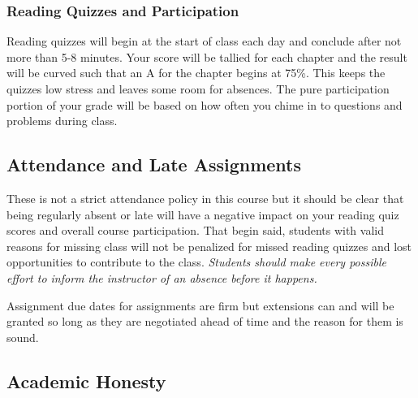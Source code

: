 \documentclass[10pt]{article}
\begin{document}
\subsubsection*{Reading Quizzes and Participation}

Reading quizzes will begin at the start of class each day and conclude after not more than 5-8 minutes. Your score will be tallied for each chapter and the result will be curved such that an A for the chapter begins at 75\%. This keeps the quizzes low stress and leaves some room for absences. The pure participation portion of your grade will be based on how often you chime in to questions and problems during class.

\subsection{Attendance and Late Assignments}

These is not a strict attendance policy in this course but it should be clear that being regularly absent or late will have a negative impact on your reading quiz scores and overall course participation. That begin said, students with valid reasons for missing class will not be penalized for missed reading quizzes and lost opportunities to contribute to the class. \textit{Students should make every possible effort to inform the instructor of an absence before it happens.}

Assignment due dates for assignments are firm but extensions can and will be granted so long as they are negotiated ahead of time and the reason for them is sound.

\subsection{Academic Honesty}
\end{document}
